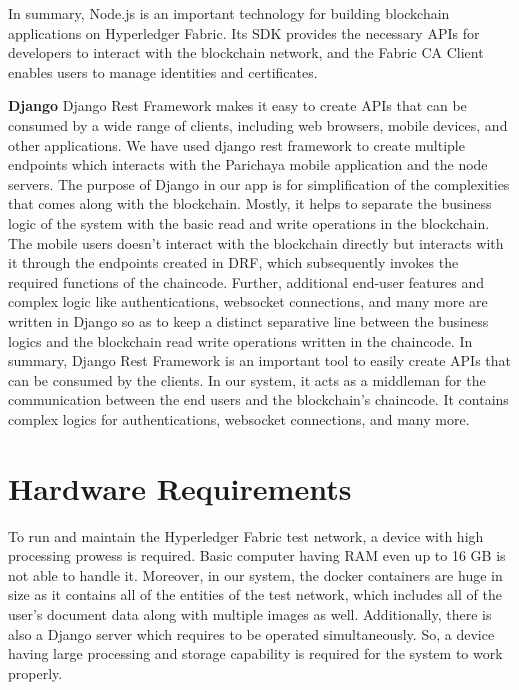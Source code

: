 In summary, Node.js is an important technology for building blockchain applications on Hyperledger Fabric. Its SDK provides the necessary APIs for developers to interact with the blockchain network, and the Fabric CA Client enables users to manage identities and certificates.

 \textbf{Django}\newline
 Django Rest Framework makes it easy to create APIs that can be consumed by a wide range of clients, including web browsers, mobile devices, and other applications. We have used django rest framework to create multiple endpoints which interacts with the Parichaya mobile application and the node servers. The purpose of Django in our app is for simplification of the complexities that comes along with the blockchain. Mostly, it helps to separate the business logic of the system with the basic read and write operations in the blockchain. The mobile users doesn’t interact with the blockchain directly but interacts with it through the endpoints created in DRF, which subsequently invokes the required functions of the chaincode. Further, additional end-user features and complex logic like authentications, websocket connections, and many more are written in Django so as to keep a distinct separative line between the business logics and the blockchain read write operations written in the chaincode.
In summary, Django Rest Framework is an important tool to easily create APIs that can be consumed by the clients. In our system, it acts as a middleman for the communication between the end users and the blockchain’s chaincode. It contains complex logics for authentications, websocket connections, and many more.




\section{Hardware Requirements}

To run and maintain the Hyperledger Fabric test network, a device with high processing prowess is required. Basic computer having RAM even up to 16 GB is not able to handle it. Moreover, in our system, the docker containers are huge in size as it contains all of the entities of the test network, which includes all of the user’s document data along with multiple images as well. Additionally, there is also a Django server which requires to be operated simultaneously. So, a device having large processing and storage capability is required for the system to work properly.
